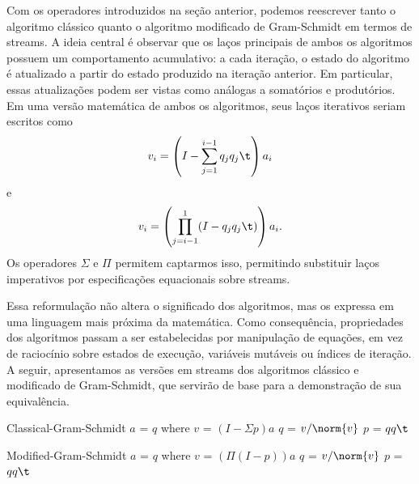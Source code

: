 
Com os operadores introduzidos na seção anterior, podemos reescrever tanto o algoritmo clássico quanto o algoritmo modificado de Gram-Schmidt em termos de streams. A ideia central é observar que os laços principais de ambos os algoritmos possuem um comportamento acumulativo: a cada iteração, o estado do algoritmo é atualizado a partir do estado produzido na iteração anterior. Em particular, essas atualizações podem ser vistas como análogas a somatórios e produtórios. Em uma versão matemática de ambos os algoritmos, seus laços iterativos seriam escritos como
\[
  v_i = \left(I - \sum_{j=1}^{i-1} q_j q_j\t \right) a_i
\]
e
\[
  v_i = \left(\prod_{j=i-1}^{1} (I - q_j q_j\t)\right) a_i.
\]
Os operadores $\Sigma$ e $\Pi$ permitem captarmos isso, permitindo substituir laços imperativos por especificações equacionais sobre streams.

Essa reformulação não altera o significado dos algoritmos, mas os expressa em uma linguagem mais próxima da matemática. Como consequência, propriedades dos algoritmos passam a ser estabelecidas por manipulação de equações, em vez de raciocínio sobre estados de execução, variáveis mutáveis ou índices de iteração. A seguir, apresentamos as versões em streams dos algoritmos clássico e modificado de Gram-Schmidt, que servirão de base para a demonstração de sua equivalência.

\begin{code}
            Classical-Gram-Schmidt $a$ = $q$
                where
                    $v$ = $(I - \Sigma p) a$
                    $q$ = $v / \norm{v}$
                    $p$ = $qq\t$

            Modified-Gram-Schmidt $a$ = $q$
                where
                    $v$ = $(\Pi(I - p)) a$
                    $q$ = $v / \norm{v}$
                    $p$ = $qq\t$
\end{code}
